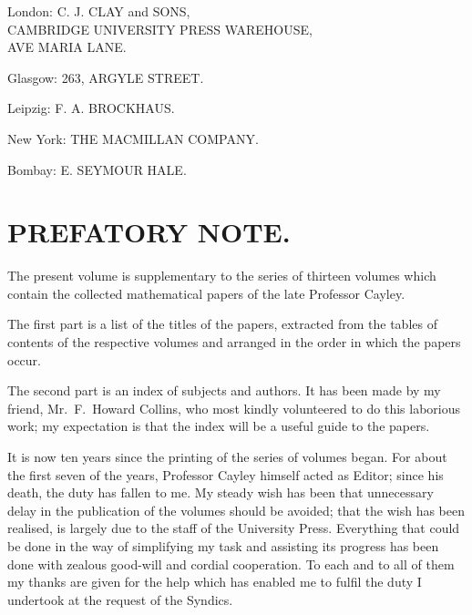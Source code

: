 \documentclass[11pt,a4paper]{article}
\begin{document}
\thispagestyle{empty}
\begin{center}
\vspace*{3cm}

{\normalsize London: C. J. CLAY and SONS,}\\
{\small CAMBRIDGE UNIVERSITY PRESS WAREHOUSE,}\\
{\small AVE MARIA LANE.}

\vspace{0.5cm}

{\small Glasgow: 263, ARGYLE STREET.}

\vspace{0.5cm}

{\small Leipzig: F. A. BROCKHAUS.}

\vspace{0.5cm}

{\small New York: THE MACMILLAN COMPANY.}

\vspace{0.5cm}

{\small Bombay: E. SEYMOUR HALE.}

\end{center}

\newpage

\section*{PREFATORY NOTE.}

The present volume is supplementary to the series of thirteen volumes which contain the collected mathematical papers of the late Professor Cayley.

The first part is a list of the titles of the papers, extracted from the tables of contents of the respective volumes and arranged in the order in which the papers occur.

The second part is an index of subjects and authors. It has been made by my friend, Mr.~F.~Howard Collins, who most kindly volunteered to do this laborious work; my expectation is that the index will be a useful guide to the papers.

It is now ten years since the printing of the series of volumes began. For about the first seven of the years, Professor Cayley himself acted as Editor; since his death, the duty has fallen to me. My steady wish has been that unnecessary delay in the publication of the volumes should be avoided; that the wish has been realised, is largely due to the staff of the University Press. Everything that could be done in the way of simplifying my task and assisting its progress has been done with zealous good-will and cordial cooperation. To each and to all of them my thanks are given for the help which has enabled me to fulfil the duty I undertook at the request of the Syndics.
\end{document}
